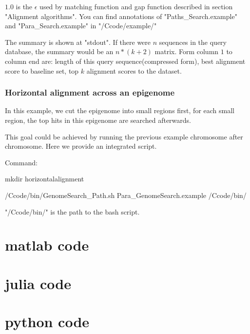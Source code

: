 \documentclass[a4paper]{article}
\begin{document}
\begin{CJK*}{UTF8}{kai}
$1.0$ is the $\epsilon$ used by matching function and gap function described in section "Alignment algorithms". You can find annotations of "Paths\_Search.example" and "Para\_Search.example" in "/Ccode/example/"

The summary is shown at "stdout". If there were $n$ sequences in the query database, the summary would be an $n*(k+2)$ matrix. Form column $1$ to column end are: length of this query sequence(compressed form), best alignment score to baseline set, top $k$ alignment scores to the dataset. 


\subsubsection{Horizontal alignment across an epigenome}

In this example, we cut the epigenome into small regions first, for each small region, the top hits in this epigenome are searched afterwards. 

This goal could be achieved by running the previous example chromosome after chromosome. Here we provide an integrated script.

Command: 

mkdir horizontalalignment

/Ccode/bin/GenomeSearch\_Path.sh Para\_GenomeSearch.example /Ccode/bin/

"/Ccode/bin/" is the path to the bash script.


\section{matlab code}

\section{julia code}

\section{python code}

\end{CJK*}
\end{document}
